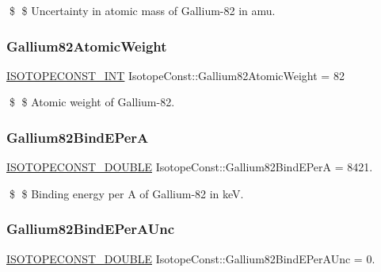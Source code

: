 \$ \$ Uncertainty in atomic mass of Gallium-\/82 in amu. \mbox{\label{group___isotope_const-_gallium-_ga82_ga0cad50ea6170853daa99dfa2ee3ab976}} 
\subsubsection{\texorpdfstring{Gallium82\+Atomic\+Weight}{Gallium82AtomicWeight}}
{\footnotesize\ttfamily \mbox{\hyperlink{group___isotope_const-_macros_ga5f18360b3e99483a35c32d789e62621c}{I\+S\+O\+T\+O\+P\+E\+C\+O\+N\+S\+T\+\_\+\+I\+NT}} Isotope\+Const\+::\+Gallium82\+Atomic\+Weight = 82}

\$ \$ Atomic weight of Gallium-\/82. \mbox{\label{group___isotope_const-_gallium-_ga82_ga80119bcc538cfc546d5a51df7dd1e73d}} 
\subsubsection{\texorpdfstring{Gallium82\+Bind\+E\+PerA}{Gallium82BindEPerA}}
{\footnotesize\ttfamily \mbox{\hyperlink{group___isotope_const-_macros_ga8f45a7272ce02c0b4c65c44636ed719a}{I\+S\+O\+T\+O\+P\+E\+C\+O\+N\+S\+T\+\_\+\+D\+O\+U\+B\+LE}} Isotope\+Const\+::\+Gallium82\+Bind\+E\+PerA = 8421.}

\$ \$ Binding energy per A of Gallium-\/82 in keV. \mbox{\label{group___isotope_const-_gallium-_ga82_gacbd26fcd7e1f34742c7b23426e5229e3}} 
\subsubsection{\texorpdfstring{Gallium82\+Bind\+E\+Per\+A\+Unc}{Gallium82BindEPerAUnc}}
{\footnotesize\ttfamily \mbox{\hyperlink{group___isotope_const-_macros_ga8f45a7272ce02c0b4c65c44636ed719a}{I\+S\+O\+T\+O\+P\+E\+C\+O\+N\+S\+T\+\_\+\+D\+O\+U\+B\+LE}} Isotope\+Const\+::\+Gallium82\+Bind\+E\+Per\+A\+Unc = 0.}

